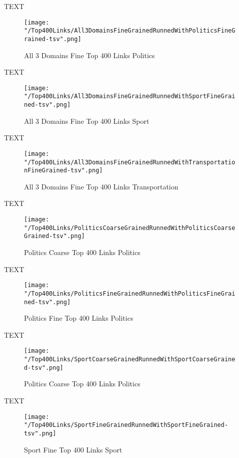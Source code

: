 \documentclass[thesis=M,english]{FITthesis}[2018/05/30]
\begin{document}
	TEXT

	\begin{figure}[H]\centering
		\texttt{[image: "/Top400Links/All3DomainsFineGrainedRunnedWithPoliticsFineGrained-tsv".png]}
		\caption{All 3 Domains Fine Top 400 Links Politics}\label{}
	\end{figure}	

	TEXT	

	\begin{figure}[H]\centering
		\texttt{[image: "/Top400Links/All3DomainsFineGrainedRunnedWithSportFineGrained-tsv".png]}
		\caption{All 3 Domains Fine Top 400 Links Sport}\label{}
	\end{figure}
	
		TEXT	

	\begin{figure}[H]\centering
		\texttt{[image: "/Top400Links/All3DomainsFineGrainedRunnedWithTransportationFineGrained-tsv".png]}
		\caption{All 3 Domains Fine Top 400 Links Transportation}\label{}	
	\end{figure}
	
	TEXT

	\begin{figure}[H]\centering
		\texttt{[image: "/Top400Links/PoliticsCoarseGrainedRunnedWithPoliticsCoarseGrained-tsv".png]}
		\caption{Politics Coarse Top 400 Links Politics}\label{}
	\end{figure}	

	TEXT	

	\begin{figure}[H]\centering
		\texttt{[image: "/Top400Links/PoliticsFineGrainedRunnedWithPoliticsFineGrained-tsv".png]}
		\caption{Politics Fine Top 400 Links Politics}\label{}
	\end{figure}

	
	TEXT

	\begin{figure}[H]\centering
		\texttt{[image: "/Top400Links/SportCoarseGrainedRunnedWithSportCoarseGrained-tsv".png]}
		\caption{Politics Coarse Top 400 Links Politics}\label{}
	\end{figure}		
	
		TEXT	

	\begin{figure}[H]\centering
		\texttt{[image: "/Top400Links/SportFineGrainedRunnedWithSportFineGrained-tsv".png]}
		\caption{Sport Fine Top 400 Links Sport}\label{}	
	\end{figure}
\end{document}
